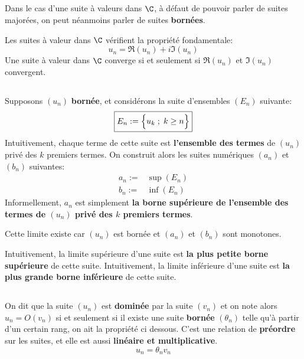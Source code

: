 \subsection*{}
Dans le cas d'une suite à valeurs dans \(\C\), à défaut de pouvoir parler de suites majorées, on peut néanmoins parler de suites \textbf{bornées}.\<

Les suites à valeur dans \(\C\) vérifient la propriété fondamentale:
\[
    \boxed{
        u_n = \Re(u_n) + i\Im(u_n)
    }
\]
Une suite à valeur dans \(\C\) converge si et seulement si \(\Re(u_n)\) et \(\Im(u_n)\) convergent.
\subsection*{}
Supposons \((u_n)\) \textbf{bornée}, et considérons la suite d'ensembles \((E_n)\) suivante:
\[
    \boxed{
        E_n := \Bigl \{ u_k \; ; \; k \geq n \Bigl \}
    }
\]
Intuitivement, chaque terme de cette suite est \textbf{l'ensemble des termes} de \((u_n)\) privé des \(k\) premiers termes.\+
On construit alors les suites numériques \((a_n)\) et \((b_n)\) suivantes:
\begin{align*}
    a_n := &\sup(E_n) \\
    b_n := &\inf(E_n)
\end{align*}
Informellement, \(a_n\) est simplement \textbf{la borne supérieure de l'ensemble des termes de \((u_n)\) privé des \(k\) premiers termes}.\<

\<

Cette limite existe car \((u_n)\) est bornée et \((a_n)\) et \((b_n)\) sont monotones.\<

Intuitivement, la limite supérieure d'une suite est \textbf{la plus petite borne supérieure} de cette suite.\+
Intuitivement, la limite inférieure d'une suite est \textbf{la plus grande borne inférieure} de cette suite.

\subsection*{}

On dit que la suite \((u_n)\) est \textbf{dominée} par la suite \((v_n)\) et on note alors \(u_n = O(v_n)\) si et seulement si il existe une suite \textbf{bornée} \((\theta_n)\) telle qu'à partir d'un certain rang, on ait la propriété ci dessous.\+
C'est une relation de \textbf{préordre} sur les suites, et elle est aussi \textbf{linéaire et multiplicative}.
\[
    u_n = \theta_n v_n
\]



